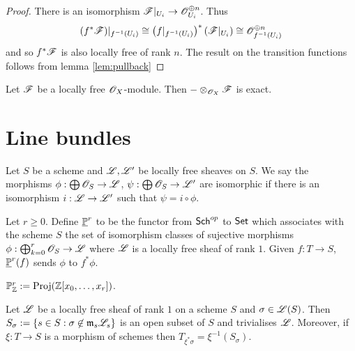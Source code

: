 \documentclass{memoir}
\begin{document}
\begin{proof}
    There is an isomorphism $\shf{F}|_{U_i}\to \shf{O}_{U_i}^{\oplus n}$.
    Thus 
    \begin{equation}
        (f^*\shf{F})|_{f^{-1}(U_i)}\cong \left(f|_{f^{-1}(U_i)}\right)^* (\shf F|_{U_i}) \cong \shf O_{f^{-1}(U_i)}^{\oplus n}
    \end{equation}
    and so $f^*\shf F$ is also locally free of rank $n$.
    The result on the transition functions follows from lemma \ref{lem:pullback}
\end{proof}
\begin{proposition}
    Let $\shf F$ be a locally free $\shf O_X$-module.
    Then $-\otimes_{\shf O_X}\shf F$ is exact.
\end{proposition}
\section{Line bundles}
\begin{definition}
    Let $S$ be a scheme and $\shf{L}, \shf{L}'$ be locally free sheaves on $S$.
    We say the morphisms $\phi:\bigoplus\shf{O}_S\to \shf{L}$, $\psi:\bigoplus\shf{O}_S\to \shf{L}'$ are isomorphic if there is an isomorphism $i:\shf{L} \to \shf{L}'$ such that $\psi = i \circ \phi$.
\end{definition}
\begin{definition}
    Let $r\ge0$.
    Define $\underline \P^r$ to be the functor from $\Sch^{op}$ to $\Set$ which associates with the scheme $S$ the set of isomorphism classes of sujective morphisms $\phi:\bigoplus_{k=0}^r\shf{O}_S\to \shf{L}$ where $\shf{L}$ is a locally free sheaf of rank $1$. 
    Given $f:T\to S$, $\underline \P^r(f)$ sends $\phi$ to $f^*\phi$.
\end{definition}
\begin{definition}
    $\P^r_\Z := \Proj(\Z[x_0,\dots,x_r])$.
\end{definition}
\begin{lemma}
    Let $\shf{L}$ be a locally free sheaf of rank $1$ on a scheme $S$ and $\sigma\in \shf{L}(S)$.
    Then $S_\sigma := \set{s\in S: \sigma\not\in \mf m_s\shf{L}_s}$ is an open subset of $S$ and trivialises $\shf{L}$.
    Moreover, if $\xi:T\to S$ is a morphism of schemes then $T_{\xi^*\sigma} = \xi^{-1}(S_\sigma)$.
\end{lemma}
\end{document}
